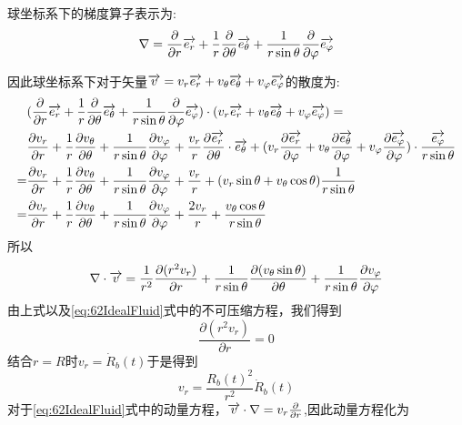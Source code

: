 球坐标系下的梯度算子表示为:
\begin{equation}
\nabla = \frac{\partial }{\partial r} \overrightarrow{e_r} + \frac{1}{r} \frac{\partial}{\partial \theta} \overrightarrow{e_{\theta}}+
\frac{1}{r\sin\theta}
\frac{\partial }{\partial \varphi}\overrightarrow{e_{\varphi}}
\end{equation}

因此球坐标系下对于矢量$\overrightarrow{v}=v_r\overrightarrow{e_r}+v_{\theta}\overrightarrow{e_{\theta}}+v_{\varphi}\overrightarrow{e_{\varphi}}$的散度为:
\begin{align*}
&(\frac{\partial }{\partial r} \overrightarrow{e_r} + \frac{1}{r} \frac{\partial}{\partial \theta} \overrightarrow{e_{\theta}}+\frac{1}{r\sin\theta}
\frac{\partial }{\partial \varphi}\overrightarrow{e_{\varphi}})\cdot (v_r\overrightarrow{e_r}+v_{\theta}\overrightarrow{e_{\theta}}+v_{\varphi}\overrightarrow{e_{\varphi}}) =\\
&\frac{\partial v_r}{\partial r}+\frac{1}{r}\frac{\partial v_{\theta}}{\partial \theta}+\frac{1}{r\sin\theta}
\frac{\partial v_{\varphi}}{\partial \varphi} +\frac{v_r}{r}\frac{\partial \overrightarrow{e_r}}{\partial \theta}\cdot \overrightarrow{e_{\theta}}+
(v_r\frac{\partial \overrightarrow{e_r}}{\partial \varphi}+v_{\theta}\frac{\partial \overrightarrow{e_{\theta}}}{\partial \varphi}+
v_{\varphi}\frac{\partial \overrightarrow{e_{\varphi}}}{\partial \varphi})\cdot \frac{\overrightarrow{e_{\varphi}}}{r \sin\theta}\\
=&\frac{\partial v_r}{\partial r}+\frac{1}{r}\frac{\partial v_{\theta}}{\partial \theta}+\frac{1}{r\sin\theta}
\frac{\partial v_{\varphi}}{\partial \varphi} +\frac{v_r}{r}+
(v_r\sin\theta+v_{\theta}\cos\theta)\frac{1}{r \sin\theta}\\
=&\frac{\partial v_r}{\partial r}+\frac{1}{r}\frac{\partial v_{\theta}}{\partial \theta}+\frac{1}{r\sin\theta}
\frac{\partial v_{\varphi}}{\partial \varphi} +\frac{2v_r}{r}+\frac{v_{\theta}\cos\theta}{r \sin\theta}
\end{align*}
所以
\begin{equation}
\nabla \cdot \overrightarrow{v}=\frac{1}{r^2}\frac{\partial (r^2 v_r)}{\partial r}+
\frac{1}{r\sin\theta}\frac{\partial (v_{\theta}\sin\theta)}{\partial \theta}+
\frac{1}{r\sin\theta}\frac{\partial v_{\varphi}}{\partial \varphi} 
\end{equation}
由上式以及\eqref{eq:62IdealFluid}式中的不可压缩方程，我们得到
\begin{equation}
\frac{\partial (r^2 v_r)}{\partial r}=0
\end{equation}
结合$r=R$时$v_r=\dot{R}_b(t)$于是得到
\begin{equation}\label{eq:62vrResult}
v_r=\frac{R_b(t)^2}{r^2}\dot{R}_b(t)
\end{equation}
对于\eqref{eq:62IdealFluid}式中的动量方程，$\overrightarrow{v}\cdot \nabla =v_r\frac{\partial}{\partial r}$,因此动量方程化为
